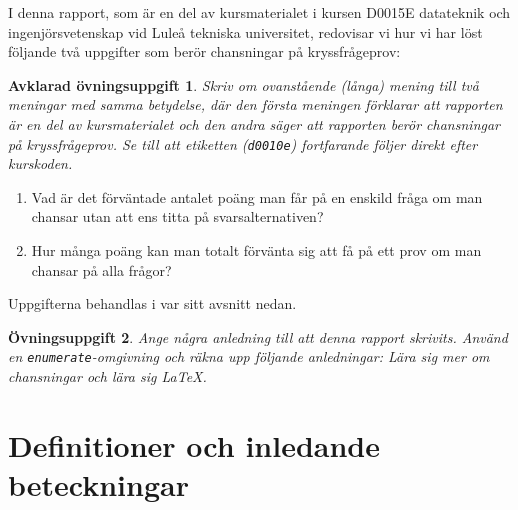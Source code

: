 \documentclass[12pt,a4wide]{article}
\theoremstyle{uppgiftsstil}
\newcommand{\ovningstext}{Övningsuppgift}
\newtheorem{ovning}{\ovningstext}
\newenvironment{uppgift}{\begin{framed}\begin{ovning}}%
                        {\end{ovning}\end{framed}}
\theoremstyle{avklaradstil}
\newcommand{\avklaradtext}{Avklarad övningsuppgift}
\newtheorem{klar}[ovning]{\avklaradtext}
\newenvironment{avklarad}{\begin{framed}\begin{klar}}%
                         {\end{klar}\end{framed}}
\begin{document}
I denna rapport, som är en del av kursmaterialet i kursen D0015E \label{d0015e} datateknik och ingenjörsvetenskap vid Luleå tekniska universitet,
redovisar vi hur vi har löst följande två uppgifter som berör chansningar på kryssfrågeprov:
%
\begin{avklarad}
  Skriv om ovanstående (långa) mening till två meningar med samma
  betydelse, där den första meningen förklarar att rapporten är en del
  av kursmaterialet och den andra säger att rapporten berör
  chansningar på kryssfrågeprov.  Se till att etiketten
  (\texttt{d0010e}) fortfarande följer direkt efter kurskoden. 
\end{avklarad}
%
\begin{enumerate}            %
  \item Vad är det förväntade antalet poäng man får på en enskild
    fråga om man chansar utan att ens titta på
    svarsalternativen? \label{item:question}  %
%
  \item Hur många poäng kan man totalt förvänta sig att få på ett prov
    om man chansar på alla frågor? \label{item:test} %
\end{enumerate}              %
%
Uppgifterna behandlas i var sitt avsnitt nedan. 
\begin{uppgift}
  Ange några anledning till att denna rapport skrivits. Använd en
  \texttt{enumerate}-omgivning och räkna upp följande anledningar:
  Lära sig mer om chansningar och lära sig \LaTeX.  
\end{uppgift}

\section{Definitioner och inledande beteckningar} 
\end{document}
